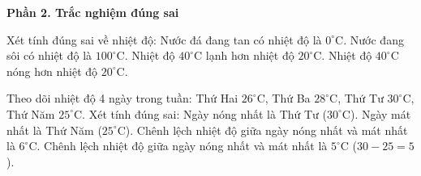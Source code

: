 \textbf{Phần 2. Trắc nghiệm đúng sai}

\begin{ex} %
Xét tính đúng sai về nhiệt độ:
\choiceTF
{\True Nước đá đang tan có nhiệt độ là $0^\circ\text{C}$.}
{\True Nước đang sôi có nhiệt độ là $100^\circ\text{C}$.}
{Nhiệt độ $40^\circ\text{C}$ lạnh hơn nhiệt độ $20^\circ\text{C}$.}
{\True Nhiệt độ $40^\circ\text{C}$ nóng hơn nhiệt độ $20^\circ\text{C}$.}
\end{ex}

\begin{ex} %
Theo dõi nhiệt độ 4 ngày trong tuần: Thứ Hai $26^\circ\text{C}$, Thứ Ba $28^\circ\text{C}$, Thứ Tư $30^\circ\text{C}$, Thứ Năm $25^\circ\text{C}$. Xét tính đúng sai:
\choiceTF
{\True Ngày nóng nhất là Thứ Tư ($30^\circ\text{C}$).}
{\True Ngày mát nhất là Thứ Năm ($25^\circ\text{C}$).}
{Chênh lệch nhiệt độ giữa ngày nóng nhất và mát nhất là $6^\circ\text{C}$.}
{\True Chênh lệch nhiệt độ giữa ngày nóng nhất và mát nhất là $5^\circ\text{C}$ ($30 - 25 = 5$).}
\end{ex}

